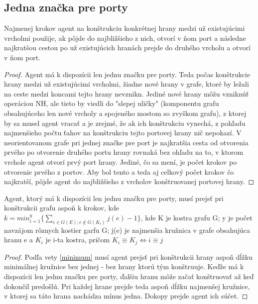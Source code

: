 \subsection{Jedna značka pre porty}

\begin{lem}
Najmenej krokov agent na konštrukciu konkrétnej hrany medzi už existujúcimi
vrcholmi použije, ak pôjde do najbližšieho z nich, otvorí v ňom port a
následne najkratšou cestou po už existujúcich hranách prejde do druhého
vrcholu a otvorí v ňom port.
\end{lem}
\begin{proof}
Agent má k dispozícii len jednu značku pre porty. Teda počas konštrukcie
hrany medzi už existujúcimi vrcholmi, žiadne nové hrany v grafe,
 ktoré by ležali na ceste medzi koncami tejto hrany nevznikn.
 Jediné nové hrany môžu vzniknúť operáciou NH, ale
tieto by viedli do "slepej uličky" (komponentu grafu obsahujúceho len nové
vrcholy a spojeného mostom so zvyškom grafu), z ktorej by sa musel agent vracať a je
zrejmé, že ak ich konštrukciu vynechá, z pohľadu najmenšieho počtu ťahov na
konštrukciu tejto portovej hrany nič nepokazí. V neorientovanom grafe
pri jednej značke pre port je najkratšia cesta od otvorenia prvého po
otvorenie druhého portu hrany rovnaká bez ohľadu na to, 
v ktorom vrchole agent otvorí prvý port hrany.
Jediné, čo sa mení, je počet krokov po otvorenie prvého z portov.
Aby bol tento a teda aj celkový počet krokov čo najkratší, pôjde agent do
najbližšieho z vrcholov konštruovanej portovej hrany.
\end{proof}

\begin{lem}
Agent, ktorý má k dispozícii len jednu značku pre porty, 
musí prejsť pri konštrukcii grafu aspoň k krokov, kde 
$k =min_{i=1}^{y}\{\sum_{e \in G(E); e \notin G(K_{i})} j(e)-1  \}$, 
kde K je kostra grafu G; y je počet navzájom rôznych kostier garfu G; j(e) je najmenšia kružnica v
grafe obsahujúca hranu e a $K_{i}$ je i-ta kostra, pričom $K_{i} \equiv K_{j}
\iff i \equiv j$
\end{lem}
\begin{proof}
Podľa vety \ref{minimum} musí agent prejsť pri konštrukcii hrany aspoň dĺžku
minimálnej kružnice bez jednej - bez hrany ktorú tým konštruuje. Keďže má k
dispozícii len jednu značku pre porty, ďalšiu hranu môže začať konštruovať
až keď dokončil predošlú. Pri každej hrane prejde teda aspoň dĺžku
najmenšej kružnice, v ktorej sa táto hrana nachádza mínus jedna. Dokopy
prejde agent ich súčet.
\end{proof}




